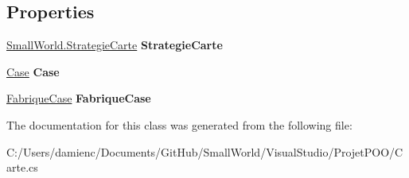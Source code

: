 \subsection*{Properties}
\begin{DoxyCompactItemize}
\item 
\hypertarget{class_small_world_1_1_carte_a50f066bfdf57cdd57724a63ca65f3df5}{\hyperlink{class_small_world_1_1_strategie_carte}{Small\-World.\-Strategie\-Carte} {\bfseries Strategie\-Carte}}\label{class_small_world_1_1_carte_a50f066bfdf57cdd57724a63ca65f3df5}

\item 
\hypertarget{class_small_world_1_1_carte_a3edb7f07af0eedb1da9026d7388bf3c9}{\hyperlink{class_small_world_1_1_case}{Case} {\bfseries Case}}\label{class_small_world_1_1_carte_a3edb7f07af0eedb1da9026d7388bf3c9}

\item 
\hypertarget{class_small_world_1_1_carte_ae2ee0aef582dad7ace4c354eee0cdf0b}{\hyperlink{class_small_world_1_1_fabrique_case}{Fabrique\-Case} {\bfseries Fabrique\-Case}}\label{class_small_world_1_1_carte_ae2ee0aef582dad7ace4c354eee0cdf0b}

\end{DoxyCompactItemize}


The documentation for this class was generated from the following file\-:\begin{DoxyCompactItemize}
\item 
C\-:/\-Users/damienc/\-Documents/\-Git\-Hub/\-Small\-World/\-Visual\-Studio/\-Projet\-P\-O\-O/Carte.\-cs\end{DoxyCompactItemize}
